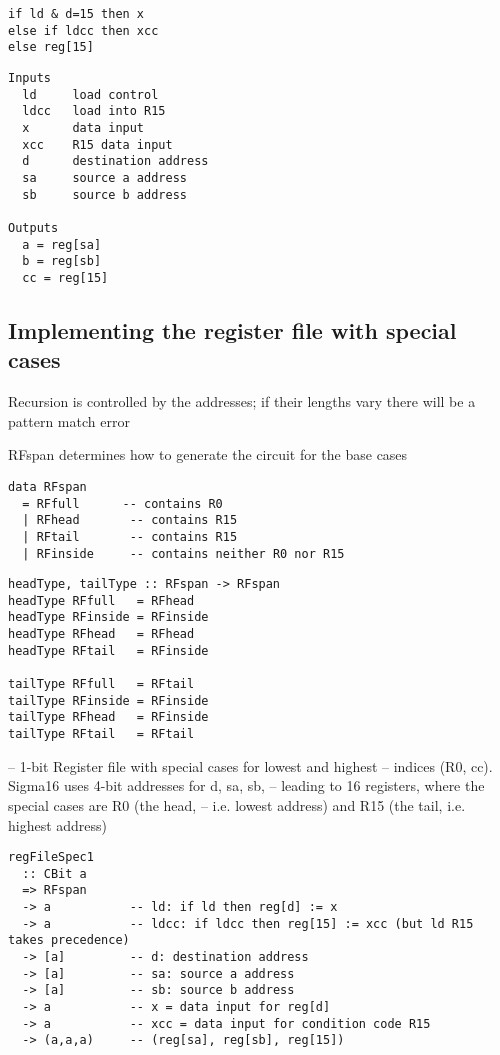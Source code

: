 \documentclass[11pt]{article}
\begin{document}
\begin{verbatim}
if ld & d=15 then x
else if ldcc then xcc
else reg[15]
\end{verbatim}


\begin{verbatim}
Inputs
  ld     load control
  ldcc   load into R15
  x      data input
  xcc    R15 data input
  d      destination address
  sa     source a address
  sb     source b address

Outputs
  a = reg[sa]
  b = reg[sb]
  cc = reg[15]
\end{verbatim}

\subsection{Implementing the register file with special cases}
\label{sec:orgd5c7fdb}

Recursion is controlled by the addresses; if their lengths vary there
will be a pattern match error

RFspan determines how to generate the circuit for the base cases

\begin{verbatim}
data RFspan
  = RFfull      -- contains R0
  | RFhead       -- contains R15
  | RFtail       -- contains R15
  | RFinside     -- contains neither R0 nor R15
\end{verbatim}

\begin{verbatim}
headType, tailType :: RFspan -> RFspan
headType RFfull   = RFhead
headType RFinside = RFinside
headType RFhead   = RFhead
headType RFtail   = RFinside

tailType RFfull   = RFtail
tailType RFinside = RFinside
tailType RFhead   = RFinside
tailType RFtail   = RFtail
\end{verbatim}

-- 1-bit Register file with special cases for lowest and highest
-- indices (R0, cc).  Sigma16 uses 4-bit addresses for d, sa, sb,
-- leading to 16 registers, where the special cases are R0 (the head,
-- i.e. lowest address) and R15 (the tail, i.e. highest address)

\begin{verbatim}
regFileSpec1
  :: CBit a
  => RFspan
  -> a           -- ld: if ld then reg[d] := x
  -> a           -- ldcc: if ldcc then reg[15] := xcc (but ld R15 takes precedence)
  -> [a]         -- d: destination address
  -> [a]         -- sa: source a address
  -> [a]         -- sb: source b address
  -> a           -- x = data input for reg[d]
  -> a           -- xcc = data input for condition code R15
  -> (a,a,a)     -- (reg[sa], reg[sb], reg[15])
\end{verbatim}
\end{document}
